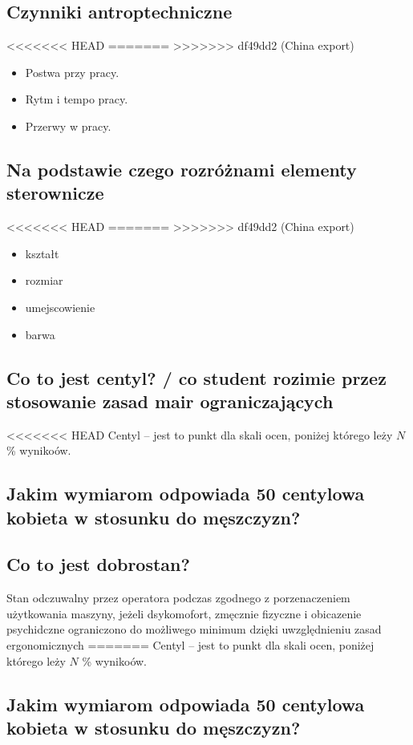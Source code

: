 \documentclass[11pt]{article}
\begin{document}
\begin{enumerate}
\subsection{Czynniki antroptechniczne}
<<<<<<< HEAD
\label{sec:org13c3584}
=======
\label{sec:org63a829f}
>>>>>>> df49dd2 (China export)
\begin{itemize}
\item Postwa przy pracy.
\item Rytm i tempo pracy.
\item Przerwy w pracy.
\end{itemize}
\subsection{Na podstawie czego rozróżnami elementy sterownicze}
<<<<<<< HEAD
\label{sec:org28b94e2}
=======
\label{sec:org6875725}
>>>>>>> df49dd2 (China export)
\begin{itemize}
\item kształt
\item rozmiar
\item umejscowienie
\item barwa
\end{itemize}
\subsection{Co to jest centyl? / co student rozimie przez stosowanie zasad mair ograniczających}
<<<<<<< HEAD
\label{sec:org865de4f}
Centyl -- jest to punkt dla skali ocen, poniżej którego leży \(N\) \% wynikoów.
\subsection{Jakim wymiarom odpowiada 50 centylowa kobieta w stosunku do męszczyzn?}
\label{sec:org7fc958a}
\subsection{Co to jest dobrostan?}
\label{sec:org2226597}
Stan odczuwalny przez operatora podczas zgodnego z porzenaczeniem użytkowania maszyny, jeżeli dsykomofort, zmęcznie fizyczne i obicazenie psychidczne ograniczono do możliwego minimum dzięki uwzględnieniu zasad ergonomicznych
=======
\label{sec:org31ca647}
Centyl -- jest to punkt dla skali ocen, poniżej którego leży \(N\) \% wynikoów.
\subsection{Jakim wymiarom odpowiada 50 centylowa kobieta w stosunku do męszczyzn?}
\label{sec:org05c3595}

\end{enumerate}
\end{document}
